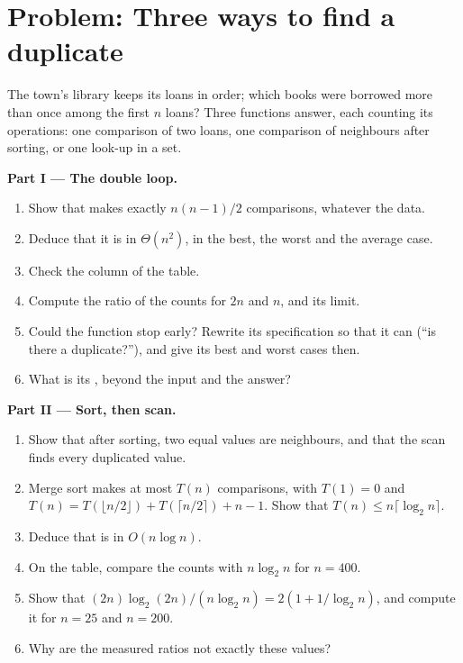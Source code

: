 \section{Problem: Three ways to find a duplicate}\label{sec:b1:asymptotic-analysis:problem}

\begin{problem}\label{pb:b1:asymptotic-analysis:1}
The town's library keeps its loans in order; which books were borrowed more than once among the first $n$ loans?
Three functions answer, each counting its operations: one comparison of two loans, one comparison of neighbours after
sorting, or one look-up in a set.
\label{lst:b1:asymptotic-analysis:duplicates}
\label{out:b1:asymptotic-analysis:duplicates}

\medskip\noindent\textbf{Part I --- The double loop.}
\begin{enumerate}
\item Show that  makes exactly $n(n - 1)/2$ comparisons, whatever the data.
\item Deduce that it is in $\Theta(n^2)$, in the best, the worst and the average case.
\item Check the column  of the table.
\item Compute the ratio of the counts for $2n$ and $n$, and its limit.
\item Could the function stop early? Rewrite its specification so that it can (``is there a duplicate?''), and give its
best and worst cases then.
\item What is its , beyond the input and the answer?
\end{enumerate}

\medskip\noindent\textbf{Part II --- Sort, then scan.}
\begin{enumerate}[resume]
\item Show that after sorting, two equal values are neighbours, and that the scan finds every duplicated value.
\item Merge sort makes at most $T(n)$ comparisons, with $T(1) = 0$ and $T(n) = T(\lfloor n/2 \rfloor) + T(\lceil n/2
\rceil) + n - 1$. Show that $T(n) \leq n \lceil \log_2 n \rceil$.
\item Deduce that  is in $O(n \log n)$.
\item On the table, compare the counts with $n \log_2 n$ for $n = 400$.
\item Show that $(2n)\log_2(2n) / (n \log_2 n) = 2(1 + 1/\log_2 n)$, and compute it for $n = 25$ and $n = 200$.
\item Why are the measured ratios not exactly these values?
\end{enumerate}


\end{problem}
